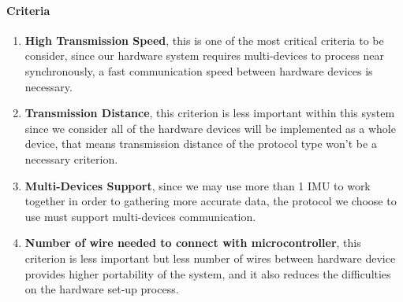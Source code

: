 \paragraph{Criteria}
\begin{enumerate}
	\item \textbf{High Transmission Speed}, this is one of the most critical criteria to be consider, since our hardware system requires multi-devices to process near synchronously, a fast communication speed between hardware devices is necessary.
	\item \textbf{Transmission Distance}, this criterion is less important within this system since we consider all of the hardware devices will be implemented as a whole device, that means transmission distance of the protocol type won’t be a necessary criterion.
	\item \textbf{Multi-Devices Support}, since we may use more than 1 IMU to work together in order to gathering more accurate data, the protocol we choose to use must support multi-devices communication.
	\item \textbf{Number of wire needed to connect with microcontroller}, this criterion is less important but less number of wires between hardware device provides higher portability of the system, and it also reduces the difficulties on the hardware set-up process.\\
\end{enumerate}

